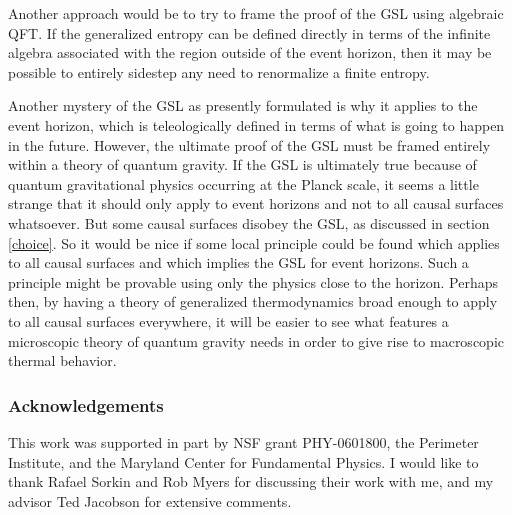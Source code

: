 \documentclass{article}
\begin{document}
Another approach would be to try to frame the proof of the GSL using algebraic QFT.  If the generalized entropy can be defined directly in terms of the infinite algebra associated with the region outside of the event horizon, then it may be possible to entirely sidestep any need to renormalize a finite entropy.

Another mystery of the GSL as presently formulated is why it applies to the event horizon, which is teleologically defined in terms of what is going to happen in the future.  However, the ultimate proof of the GSL must be framed entirely within a theory of quantum gravity.  If the GSL is ultimately true because of quantum gravitational physics occurring at the Planck scale, it seems a little strange that it should only apply to event horizons and not to all causal surfaces whatsoever.  But some causal surfaces disobey the GSL, as discussed in section \ref{choice}.  So it would be nice if some local principle could be found which applies to all causal surfaces and which implies the GSL for event horizons.  Such a principle might be provable using only the physics close to the horizon.  Perhaps then, by having a theory of generalized thermodynamics broad enough to apply to all causal surfaces everywhere, it will be easier to see what features a microscopic theory of quantum gravity needs in order to give rise to macroscopic thermal behavior.

\vspace{-4pt}

\small
\subsubsection*{Acknowledgements}

This work was supported in part by NSF grant PHY-0601800, the Perimeter Institute, and the Maryland Center for Fundamental Physics.  I would like to thank Rafael Sorkin and Rob Myers for discussing their work with me, and my advisor Ted Jacobson for extensive comments.
\normalsize

\vspace{-8pt}
\end{document}
